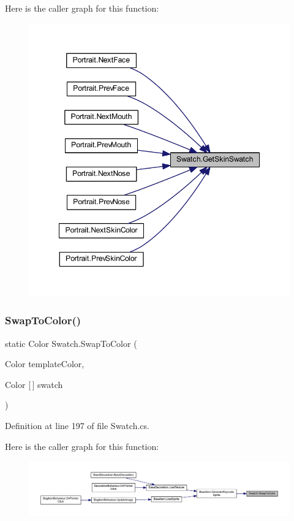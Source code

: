Here is the caller graph for this function\+:
\nopagebreak
\begin{figure}[H]
\begin{center}
\leavevmode
\includegraphics[width=348pt]{class_swatch_aad8681cfc4c7902a684220e08e67b00b_icgraph}
\end{center}
\end{figure}
\mbox{\label{class_swatch_aa6e64b48c8403d88179beb90da11c2f8}} 
\subsubsection{\texorpdfstring{SwapToColor()}{SwapToColor()}}
{\footnotesize\ttfamily static Color Swatch.\+Swap\+To\+Color (\begin{DoxyParamCaption}\item[{Color}]{template\+Color,  }\item[{Color \mbox{[}$\,$\mbox{]}}]{swatch }\end{DoxyParamCaption})\hspace{0.3cm}{\ttfamily [static]}}



Definition at line 197 of file Swatch.\+cs.

Here is the caller graph for this function\+:
\nopagebreak
\begin{figure}[H]
\begin{center}
\leavevmode
\includegraphics[width=350pt]{class_swatch_aa6e64b48c8403d88179beb90da11c2f8_icgraph}
\end{center}
\end{figure}


